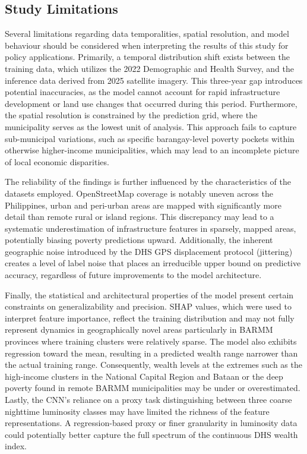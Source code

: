 \documentclass[12pt, letterpaper]{article}
\numberwithin{figure}{section}
\numberwithin{table}{section}
\begin{document}
\subsection{Study Limitations}
Several limitations regarding data temporalities, spatial resolution,
and model behaviour should be considered when interpreting the
results of this study for policy applications. Primarily, a temporal
distribution shift exists between the training data, which utilizes
the 2022 Demographic and Health Survey, and the inference data
derived from 2025 satellite imagery. This three-year gap introduces
potential inaccuracies, as the model cannot account for rapid
infrastructure development or land use changes that occurred during
this period. Furthermore, the spatial resolution is constrained by
the prediction grid, where the municipality serves as the lowest unit
of analysis. This approach fails to capture sub-municipal variations,
such as specific barangay-level poverty pockets within otherwise
higher-income municipalities, which may lead to an incomplete picture
of local economic disparities.

The reliability of the findings is further influenced by the
characteristics of the datasets employed. OpenStreetMap coverage is
notably uneven across the Philippines, urban and peri-urban areas are
mapped with significantly more detail than remote rural or island
regions. This discrepancy may lead to a systematic underestimation of
infrastructure features in sparsely, mapped areas, potentially
biasing poverty predictions upward. Additionally, the inherent
geographic noise introduced by the DHS GPS displacement protocol
(jittering) creates a level of  label noise that places an
irreducible upper bound on predictive accuracy, regardless of future
improvements to the model architecture.

Finally, the statistical and architectural properties of the model
present certain constraints on generalizability and precision. SHAP
values, which were used to interpret feature importance, reflect the
training distribution and may not fully represent dynamics in
geographically novel areas particularly in BARMM provinces where
training clusters were relatively sparse. The model also exhibits
regression toward the mean, resulting in a predicted wealth range
narrower than the actual training range. Consequently, wealth levels
at the extremes such as the high-income clusters in the National
Capital Region and Bataan or the deep poverty found in remote BARMM
municipalities may be under or overestimated. Lastly, the CNN's
reliance on a proxy task distinguishing between three coarse
nighttime luminosity classes may have limited the richness of the
feature representations. A regression-based proxy or finer
granularity in luminosity data could potentially better capture the
full spectrum of the continuous DHS wealth index.
\end{document}
